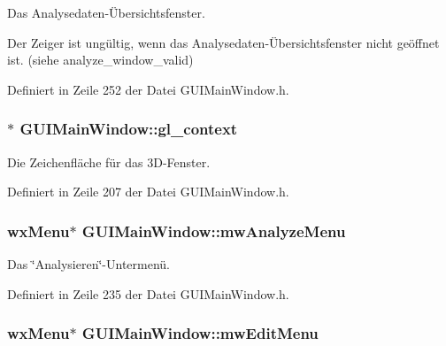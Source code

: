 Das Analysedaten-\/Übersichtsfenster. 

Der Zeiger ist ungültig, wenn das Analysedaten-\/Übersichtsfenster nicht geöffnet ist. (siehe analyze\-\_\-window\-\_\-valid) 

Definiert in Zeile 252 der Datei G\-U\-I\-Main\-Window.\-h.

\hypertarget{classGUIMainWindow_a7b5069afb8996ff001654f8d832b2bfa}{
\subsubsection[{gl\-\_\-context}]{$\ast$ G\-U\-I\-Main\-Window\-::gl\-\_\-context\hspace{0.3cm}{\ttfamily [private]}}}\label{classGUIMainWindow_a7b5069afb8996ff001654f8d832b2bfa}


Die Zeichenfläche für das 3\-D-\/\-Fenster. 



Definiert in Zeile 207 der Datei G\-U\-I\-Main\-Window.\-h.

\hypertarget{classGUIMainWindow_ab93a87b5cde10015dc02dc000c409f90}{
\subsubsection[{mw\-Analyze\-Menu}]{\setlength{\rightskip}{0pt plus 5cm}wx\-Menu$\ast$ G\-U\-I\-Main\-Window\-::mw\-Analyze\-Menu\hspace{0.3cm}{\ttfamily [private]}}}\label{classGUIMainWindow_ab93a87b5cde10015dc02dc000c409f90}


Das \char`\"{}\-Analysieren\char`\"{}-\/\-Untermenü. 



Definiert in Zeile 235 der Datei G\-U\-I\-Main\-Window.\-h.

\hypertarget{classGUIMainWindow_a32c50be8574176c02aadb47626adc9d4}{
\subsubsection[{mw\-Edit\-Menu}]{\setlength{\rightskip}{0pt plus 5cm}wx\-Menu$\ast$ G\-U\-I\-Main\-Window\-::mw\-Edit\-Menu\hspace{0.3cm}{\ttfamily [private]}}}\label{classGUIMainWindow_a32c50be8574176c02aadb47626adc9d4}


